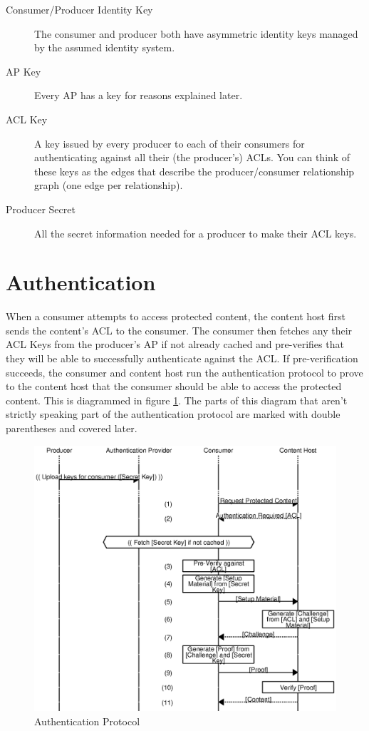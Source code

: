 \documentclass[pdftex,12pt,a4papaer,twoside,notitlepage]{report}
\begin{document}
\begin{description}
\item[Consumer/Producer Identity Key] The consumer and producer both have
  asymmetric identity keys managed by the assumed identity system.
\item[AP Key] Every AP has a key for reasons explained later.
\item[ACL Key] A key issued by every producer to each of their consumers for
  authenticating against all their (the producer's) ACLs. You can think of these
  keys as the edges that describe the producer/consumer relationship graph (one
  edge per relationship).
\item[Producer Secret] All the secret information needed for a producer to make
  their ACL keys.
\end{description}

\section{Authentication}
\label{sec:authentication}

When a consumer attempts to access protected content, the content host first
sends the content's ACL to the consumer. The consumer then fetches any their ACL
Keys from the producer's AP if not already cached and pre-verifies that they
will be able to successfully authenticate against the ACL. If pre-verification
succeeds, the consumer and content host run the authentication protocol to prove
to the content host that the consumer should be able to access the protected
content. This is diagrammed in figure \cref{fig:auth}. The parts of this diagram
that aren't strictly speaking part of the authentication protocol are marked
with double parentheses and covered later.

\begin{figure}
    \includegraphics{auth.eps}
    \caption{Authentication Protocol}
    \label{fig:auth}
\end{figure}
\end{document}
